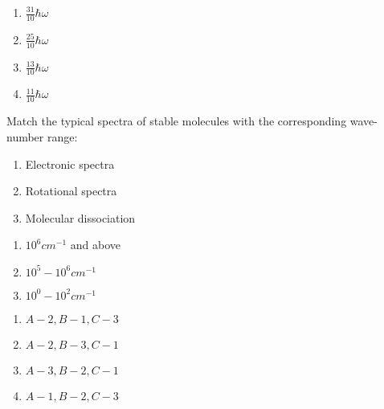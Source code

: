 \begin{multicols}{4}
\begin{enumerate}
\item $\frac{31}{10}\hbar\omega$ 
\item $\frac{25}{10}\hbar\omega$ 
\item $\frac{13}{10}\hbar\omega$
\item $\frac{11}{10}\hbar\omega$
\end{enumerate}
\end{multicols}

\item Match the typical spectra of stable molecules with the corresponding wave-number range:
\begin{multicols}{2}
			\begin{enumerate}[label=(\Alph*)]
                
				\item Electronic spectra
				\item Rotational spectra
                    \item Molecular dissociation
			\end{enumerate}
			\columnbreak
			\begin{enumerate}[label=(\arabic*)]
				\item $10^6 cm^{-1}$ and above
				\item $10^5 - 10^6 cm^{-1}$
				\item $10^0 - 10^2 cm^{-1}$
                    
			\end{enumerate}
		\end{multicols}

      \begin{multicols}{2}
        \begin{enumerate}
            \item $A-2,B-1,C-3$
            \item $A-2,B-3,C-1$
            \item $A-3,B-2,C-1$
            \item $A-1,B-2,C-3$
        \end{enumerate}
    \end{multicols}
 
